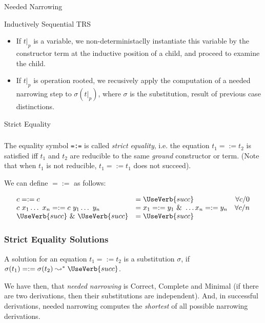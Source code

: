 \documentclass{beamer}
\begin{document}
\begin{section}{Needed Narrowing}
\begin{subsection}{Inductively Sequential TRS}
\begin{frame}
\begin{itemize}
\begin{itemize}
  \item If $t|_p$ is a variable, we non-deterministaclly instantiate this variable by the constructor term at the inductive position of a child, and proceed to examine the child.

  \item If $t|_p$ is operation rooted, we recusively apply the computation of a needed narrowing step to $\sigma(t|_p)$, where $\sigma$ is the substitution, result of previous case distinctions.
  \end{itemize}
\end{itemize}

\end{frame}
\end{subsection}
\begin{subsection}{Strict Equality}
\begin{frame}[fragile]
\frametitle{\subsecname}
    The equality symbol \verb|=:=| is called \textit{strict equality}, i.e. the equation $t_1 =:= t_2$ is satisfied iff $t_1$ and $t_2$ are reducible to the same \textit{ground} constructor or term. (Note that when $t_1$ is not reducible, $t_1 =:= t_1$ does not succeed).

    We can define $=:=$ as follows:

    \[
    \begin{array}{llr}
    
      c =:= c &= \UseVerb{succ} &\forall  c/0\\
      c ~ x_1 \ldots ~ x_n =:= c ~ y_1 \ldots ~ y_n &= x_1 =:= y_1 ~\&~ \ldots x_n =:= y_n &\forall c/n \\
      \UseVerb{succ}~ \&~ \UseVerb{succ} &= \UseVerb{succ}
    \end{array}
    \]
\end{frame}

\begin{frame}[fragile]
\frametitle{Strict Equality Solutions}
A solution for an equation $t_1 =:= t_2$ is a substitution $\sigma$, if $\sigma(t_1) =:= \sigma(t_2) \leadsto^* \UseVerb{succ}$.

We have then, that \textit{needed narrowing} is Correct, Complete and Minimal (if there are two derivations, then their substitutions are independent). And, in successful derivations, needed narrowing computes the \textit{shortest} of all possible narrowing derivations.

\end{frame}
\end{subsection}


\end{section}
\end{document}
